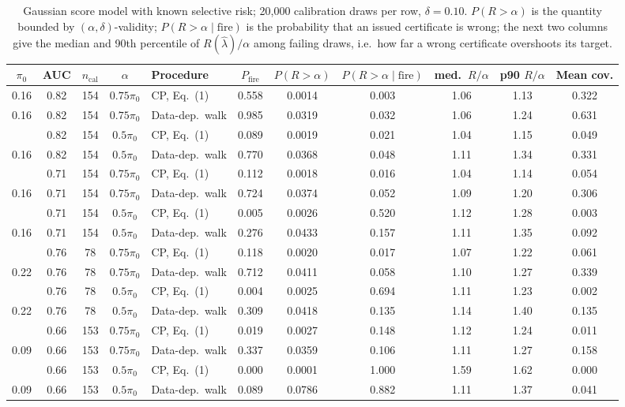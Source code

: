 \begin{table}[H]
\centering\small
\caption{Gaussian score model with known selective risk; 20{,}000 calibration draws per row, $\delta=0.10$. $P(R>\alpha)$ is the quantity bounded by $(\alpha,\delta)$-validity; $P(R>\alpha\mid\text{fire})$ is the probability that an issued certificate is wrong; the next two columns give the median and 90th percentile of $R(\hat\lambda)/\alpha$ among failing draws, i.e.\ how far a wrong certificate overshoots its target.}
\label{tab:synthetic}
\setlength{\tabcolsep}{4pt}
\begin{tabular}{cccc l cccccc}
\toprule
$\pi_0$ & AUC & $n_{\mathrm{cal}}$ & $\alpha$ & Procedure & $P_{\mathrm{fire}}$ & $P(R>\alpha)$ & $P(R>\alpha\mid\text{fire})$ & med.\ $R/\alpha$ & p90 $R/\alpha$ & Mean cov. \\
\midrule
0.16 & 0.82 & 154 & $0.75\pi_0$ & CP, Eq.~(1) & 0.558 & 0.0014 & 0.003 & 1.06 & 1.13 & 0.322 \\
0.16 & 0.82 & 154 & $0.75\pi_0$ & Data-dep.\ walk & 0.985 & 0.0319 & 0.032 & 1.06 & 1.24 & 0.631 \\
\addlinespace
0.16 & 0.82 & 154 & $0.5\pi_0$ & CP, Eq.~(1) & 0.089 & 0.0019 & 0.021 & 1.04 & 1.15 & 0.049 \\
0.16 & 0.82 & 154 & $0.5\pi_0$ & Data-dep.\ walk & 0.770 & 0.0368 & 0.048 & 1.11 & 1.34 & 0.331 \\
\addlinespace
0.16 & 0.71 & 154 & $0.75\pi_0$ & CP, Eq.~(1) & 0.112 & 0.0018 & 0.016 & 1.04 & 1.14 & 0.054 \\
0.16 & 0.71 & 154 & $0.75\pi_0$ & Data-dep.\ walk & 0.724 & 0.0374 & 0.052 & 1.09 & 1.20 & 0.306 \\
\addlinespace
0.16 & 0.71 & 154 & $0.5\pi_0$ & CP, Eq.~(1) & 0.005 & 0.0026 & 0.520 & 1.12 & 1.28 & 0.003 \\
0.16 & 0.71 & 154 & $0.5\pi_0$ & Data-dep.\ walk & 0.276 & 0.0433 & 0.157 & 1.11 & 1.35 & 0.092 \\
\addlinespace
0.22 & 0.76 & 78 & $0.75\pi_0$ & CP, Eq.~(1) & 0.118 & 0.0020 & 0.017 & 1.07 & 1.22 & 0.061 \\
0.22 & 0.76 & 78 & $0.75\pi_0$ & Data-dep.\ walk & 0.712 & 0.0411 & 0.058 & 1.10 & 1.27 & 0.339 \\
\addlinespace
0.22 & 0.76 & 78 & $0.5\pi_0$ & CP, Eq.~(1) & 0.004 & 0.0025 & 0.694 & 1.11 & 1.23 & 0.002 \\
0.22 & 0.76 & 78 & $0.5\pi_0$ & Data-dep.\ walk & 0.309 & 0.0418 & 0.135 & 1.14 & 1.40 & 0.135 \\
\addlinespace
0.09 & 0.66 & 153 & $0.75\pi_0$ & CP, Eq.~(1) & 0.019 & 0.0027 & 0.148 & 1.12 & 1.24 & 0.011 \\
0.09 & 0.66 & 153 & $0.75\pi_0$ & Data-dep.\ walk & 0.337 & 0.0359 & 0.106 & 1.11 & 1.27 & 0.158 \\
\addlinespace
0.09 & 0.66 & 153 & $0.5\pi_0$ & CP, Eq.~(1) & 0.000 & 0.0001 & 1.000 & 1.59 & 1.62 & 0.000 \\
0.09 & 0.66 & 153 & $0.5\pi_0$ & Data-dep.\ walk & 0.089 & 0.0786 & 0.882 & 1.11 & 1.37 & 0.041 \\
\bottomrule
\end{tabular}
\end{table}
